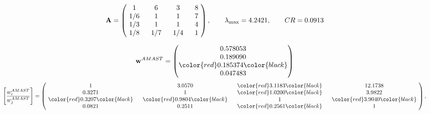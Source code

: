 \begin{example}
\begin{equation*}
\mathbf{A} =
\begin{pmatrix}
$\,\,$ 1 $\,\,$ & $\,\,$6$\,\,$ & $\,\,$3$\,\,$ & $\,\,$8 $\,\,$ \\
$\,\,$ 1/6$\,\,$ & $\,\,$ 1 $\,\,$ & $\,\,$1$\,\,$ & $\,\,$7 $\,\,$ \\
$\,\,$ 1/3$\,\,$ & $\,\,$ 1 $\,\,$ & $\,\,$ 1 $\,\,$ & $\,\,$4 $\,\,$ \\
$\,\,$ 1/8$\,\,$ & $\,\,$ 1/7$\,\,$ & $\,\,$ 1/4$\,\,$ & $\,\,$ 1  $\,\,$ \\
\end{pmatrix},
\qquad
\lambda_{\max} =
4.2421,
\qquad
CR = 0.0913
\end{equation*}

\begin{equation*}
\mathbf{w}^{AMAST} =
\begin{pmatrix}
0.578053\\
0.189090\\
\color{red} 0.185374\color{black} \\
0.047483
\end{pmatrix}\end{equation*}
\begin{equation*}
\left[ \frac{{w}^{AMAST}_i}{{w}^{AMAST}_j} \right] =
\begin{pmatrix}
$\,\,$ 1 $\,\,$ & $\,\,$3.0570$\,\,$ & $\,\,$\color{red} 3.1183\color{black} $\,\,$ & $\,\,$12.1738$\,\,$ \\
$\,\,$0.3271$\,\,$ & $\,\,$ 1 $\,\,$ & $\,\,$\color{red} 1.0200\color{black} $\,\,$ & $\,\,$3.9822  $\,\,$ \\
$\,\,$\color{red} 0.3207\color{black} $\,\,$ & $\,\,$\color{red} 0.9804\color{black} $\,\,$ & $\,\,$ 1 $\,\,$ & $\,\,$\color{red} 3.9040\color{black}  $\,\,$ \\
$\,\,$0.0821$\,\,$ & $\,\,$0.2511$\,\,$ & $\,\,$\color{red} 0.2561\color{black} $\,\,$ & $\,\,$ 1  $\,\,$ \\
\end{pmatrix},
\end{equation*}


\end{example}
